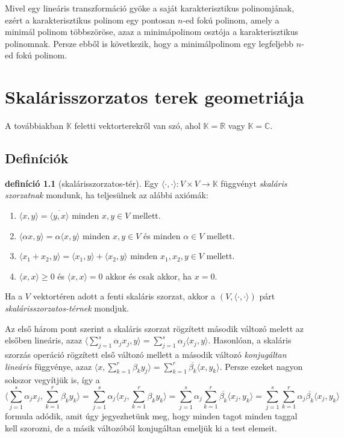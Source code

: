\documentclass[9pt, a4paper, showtrims]{memoir}
\theoremstyle{plain}
\theoremstyle{remark}
\theoremstyle{definition}
\newtheorem{definition}[proposition]{definíció}
\newcommand{\ip}[2]{\langle#1,#2\rangle}
\begin{document}
Mivel egy lineáris transzformáció gyöke a saját karakterisztikus polinomjának,
ezért a karakterisztikus polinom egy pontosan $n$-ed fokú polinom, 
amely a minimál polinom többszöröse,
azaz a minimápolinom osztója a karakterisztikus polinomnak.
Persze ebből is következik, hogy a minimálpolinom egy legfeljebb $n$-ed fokú polinom.

\chapter{Skalárisszorzatos terek geometriája}
A továbbiakban $\mathbb{K}$ feletti vektorterekről van szó,
ahol $\mathbb{K}=\mathbb{R}$ vagy $\mathbb{K}=\mathbb{C}$.
\section{Definíciók}

\begin{definition}[skalárisszorzatos-tér]
    Egy $\ip{\cdot}{\cdot}:V\times V\to \mathbb{K}$ függvényt \emph{skaláris szorzatnak} mondunk, ha
    teljesülnek az alábbi axiómák:
    \begin{enumerate}
        \item $\ip{x}{y}=\overline{\ip{y}{x}}$ minden $x,y\in V$ mellett.
        \item 
            $\ip{\alpha x}{y}=
            \alpha\ip{x}{y}$ minden $x,y\in V$ és minden $\alpha\in V$ mellett.
        \item
            $\ip{x_1+x_2}{y}=
            \ip{x_1}{y}+\ip{x_2}{y}$ minden $x_1,x_2,y\in V$ mellett.
        \item 
            $\ip{x}{x}\geq 0$ és $\ip{x}{x}=0$ akkor és csak akkor, ha $x=0$.
    \end{enumerate}
    Ha a $V$ vektortéren adott a fenti skaláris szorzat, 
    akkor a $\left( V,\ip{\cdot}{\cdot} \right)$ párt \emph{skalárisszorzatos-térnek} mondjuk.
\end{definition}
Az első három pont szerint a skaláris szorzat rögzített második változó melett az elsőben lineáris, azaz 
$
    \ip{\sum_{j=1}^s\alpha_jx_j}{y}
    =
    \sum_{j=1}^s\alpha_j\ip{x_j}{y}$.
Hasonlóan, a skaláris szorzás operáció rögzített első változó mellett a második változó
\emph{konjugáltan lineáris} függvénye, 
azaz
\begin{math}
    \ip{x}{\sum_{k=1}^r\beta_ky_j}
    =
    \sum_{k=1}^r\overline{\beta_k}\ip{x}{y_k}.
\end{math}
Persze ezeket nagyon sokszor vegyítjük is, 
így a
\[
    \ip{\sum_{j=1}^s\alpha_jx_j}{\sum_{k=1}^r\beta_ky_k}
    =
    \sum_{j=1}^s\alpha_j\ip{x_j}{\sum_{k=1}^r\beta_ky_k}
    =
    \sum_{j=1}^s\alpha_j\sum_{k=1}^r\overline{\beta_k}\ip{x_j}{y_k}
    =
    \sum_{j=1}^s\sum_{k=1}^r\alpha_j\overline{\beta_k}\ip{x_j}{y_k}
\]
formula adódik, amit úgy jegyezhetünk meg, hogy minden tagot minden taggal kell szorozni,
de a másik változóból konjugáltan emeljük ki a test elemeit.
\end{document}

